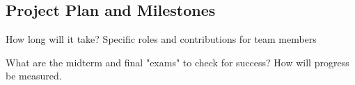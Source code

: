\subsection{Project Plan and Milestones}
How long will it take?   Specific roles and contributions for team members

What are the midterm and final "exams" to check for success? How will progress be measured.

